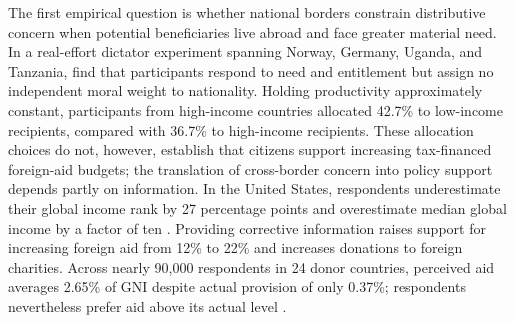 \documentclass[11pt,a4paper]{article}
\begin{document}
The first empirical question is whether national borders constrain distributive concern when potential beneficiaries live abroad and face greater material need. In a real-effort dictator experiment spanning Norway, Germany, Uganda, and Tanzania, \citet{cappelen_needs_2013} find that participants respond to need and entitlement %
but assign no independent moral weight to nationality. Holding productivity approximately constant, participants from high-income countries allocated 42.7\% to low-income recipients, compared with 36.7\% to high-income recipients. These allocation choices do not, however, establish that citizens support increasing tax-financed foreign-aid budgets; the translation of cross-border concern into policy support depends partly on information. %
In the United States, respondents underestimate their global income rank by 27 percentage points and overestimate median global income by a factor of ten \citep{nair_misperceptions_2018}. %
Providing corrective information raises support for increasing foreign aid from 12\% to 22\% and increases donations to foreign charities. %
Across nearly 90,000 respondents in 24 donor countries, perceived aid averages 2.65\% of GNI despite actual provision of only 0.37\%; respondents nevertheless prefer aid above its actual level \citep{kaufmann_foreign_2019}. %
\end{document}
